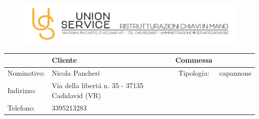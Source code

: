 \documentclass[pdftex,11pt,a4paper]{article}
\begin{document}
\begin{figure}[!t]
\includegraphics[width=\textwidth]{intestazioneAlta.jpg}
\end{figure}

\begin{center}
  \begin{tabular}{| l  l | c  l|}
    \hline
      & Cliente & Commessa &  \\ \hline
    Nominativo: & Nicola Pancheri & Tipologia: & capannone \\ 
    Indirizzo: &  Via della libert\'a n. 35 - 37135 Cadidavid (VR) &  & \\
    Telefono: &  3395213283 & &\\
    \hline
  \end{tabular}
\end{center}
\end{document}
